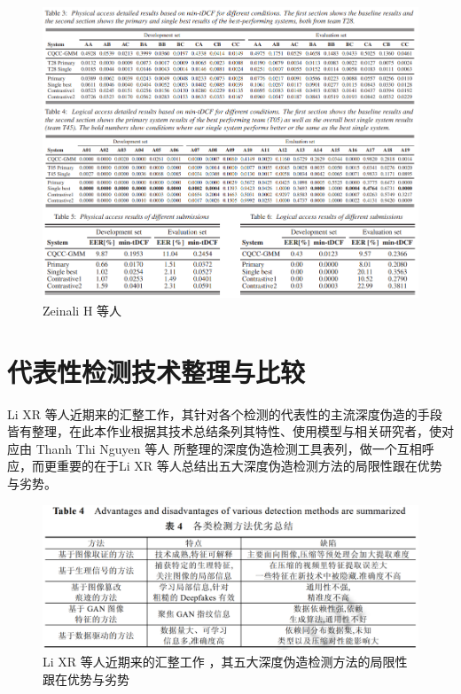 \begin{figure}[htb]
\centering 
\includegraphics[width=1.05\textwidth]{img/ch3m17.png} 
\caption{Zeinali H 等人 \cite{zeinali2019detecting} }
\label{Test}
\end{figure}

\section{代表性检测技术整理与比较}

Li XR 等人近期来的汇整工作\cite{2021496}，其针对各个检测的代表性的主流深度伪造的手段皆有整理，在此本作业根据其技术总结条列其特性、使用模型与相关研究者，使对应由 Thanh Thi Nguyen 等人 \cite{https://doi.org/10.48550/arxiv.1909.11573} 所整理的深度伪造检测工具表列，做一个互相呼应，而更重要的在于Li XR 等人总结出五大深度伪造检测方法的局限性跟在优势与劣势。

\begin{figure}[htb]
\centering 
\includegraphics[width=1.05\textwidth]{img/ch3m18.png} 
\caption{Li XR 等人近期来的汇整工作\cite{2021496} ，其五大深度伪造检测方法的局限性跟在优势与劣势}
\label{Test}
\end{figure}

